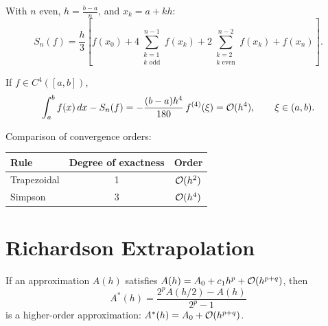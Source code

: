 \begin{definition}
\label{def:simpson-composite}
With $n$ even, $h = \frac{b-a}{n}$, and $x_k = a + kh$:
\[
    S_n(f) = \frac{h}{3}\left[f(x_0) + 4\sum_{\substack{k=1 \\ k\text{ odd}}}^{n-1} f(x_k) + 2\sum_{\substack{k=2 \\ k\text{ even}}}^{n-2} f(x_k) + f(x_n)\right].
\]
\end{definition}

\begin{theorem}
\label{thm:simpson-composite-error}
If $f \in C^4([a,b])$,
\[
    \int_a^b f(x)\,dx - S_n(f) = -\frac{(b-a)h^4}{180}\,f^{(4)}(\xi) = \mathcal{O}(h^4), \qquad \xi \in (a,b).
\]
\end{theorem}

\begin{remark}
Comparison of convergence orders:
\begin{center}
\begin{tabular}{lcc}
    \toprule
    \textbf{Rule} & \textbf{Degree of exactness} & \textbf{Order} \\
    \midrule
    Trapezoidal & 1 & $\mathcal{O}(h^2)$ \\
    Simpson     & 3 & $\mathcal{O}(h^4)$ \\
    \bottomrule
\end{tabular}
\end{center}
\end{remark}

\section{Richardson Extrapolation}

\begin{definition}
\label{def:richardson}
If an approximation $A(h)$ satisfies $A(h) = A_0 + c_1 h^p + \mathcal{O}(h^{p+q})$, then
\[
    A^*(h) = \frac{2^p A(h/2) - A(h)}{2^p - 1}
\]
is a higher-order approximation: $A^*(h) = A_0 + \mathcal{O}(h^{p+q})$.
\end{definition}

